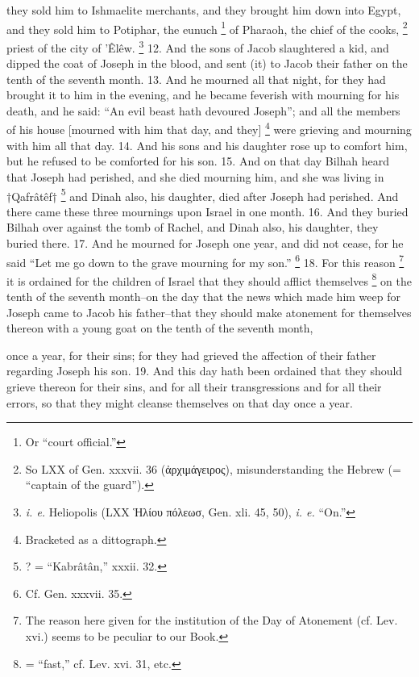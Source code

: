 they sold him to Ishmaelite merchants, and they brought him down into Egypt, and they sold him to Potiphar, the eunuch \footnote{Or ``court official.''} of Pharaoh, the chief of the cooks, \footnote{So LXX of Gen. xxxvii. 36 (\textgreek{ἀρχιμάγειρος}), misunderstanding the Hebrew (= ``captain of the guard'').} priest of the city of ’Êlêw. \footnote{\emph{i. e.} Heliopolis (LXX \textgreek{Ἡλίου πόλεωσ}, Gen. xli. 45, 50), \emph{i. e.} ``On.''} 12. And the sons of Jacob slaughtered a kid, and dipped the coat of Joseph in the blood, and sent (it) to Jacob their father on the tenth of the seventh month. 13. And he mourned all that night, for they had brought it to him in the evening, and he became feverish with mourning for his death, and he said: ``An evil beast hath devoured Joseph''; and all the members of his house [mourned with him that day, and they] \footnote{Bracketed as a dittograph.} were grieving and mourning with him all that day. 14. And his sons and his daughter rose up to comfort him, but he refused to be comforted for his son. 15. And on that day Bilhah heard that Joseph had perished, and she died mourning him, and she was living in †Qafrâtêf† \footnote{? = ``Kabrâtân,'' xxxii. 32.} and Dinah also, his daughter, died after Joseph had perished. And there came these three mournings upon Israel in one month. 16. And they buried Bilhah over against the tomb of Rachel, and Dinah also, his daughter, they buried there. 17. And he mourned for Joseph one year, and did not cease, for he said ``Let me go down to the grave mourning for my son.'' \footnote{Cf. Gen. xxxvii. 35.} 18. For this reason \footnote{The reason here given for the institution of the Day of Atonement (cf. Lev. xvi.) seems to be peculiar to our Book.} it is ordained for the children of Israel that they should afflict themselves \footnote{= ``fast,'' cf. Lev. xvi. 31, etc.} on the tenth of the seventh month--on the day that the news which made him weep for Joseph came to Jacob his father--that they should make atonement for themselves thereon with a young goat on the tenth of the seventh month,

once a year, for their sins; for they had grieved the affection of their father regarding Joseph his son. 19. And this day hath been ordained that they should grieve thereon for their sins, and for all their transgressions and for all their errors, so that they might cleanse themselves on that day once a year.


